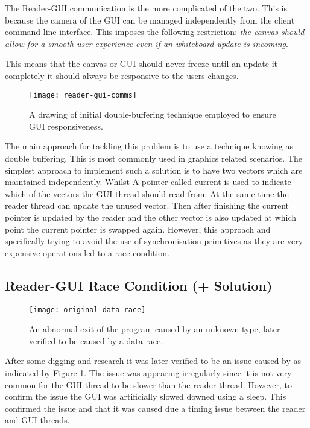 \documentclass[article]{uom-coursework}
\begin{document}
The Reader-GUI communication is the more complicated of the two.
This is because the camera of the GUI can be managed
independently from the client command line interface. This
imposes the following restriction: \emph{the canvas should allow
for a smooth user experience even if an whiteboard update is
incoming}.

This means that the canvas or GUI should never freeze until an
update it completely it should always be responsive to the users
changes.

\begin{figure}[H]
\centering
\begin{mdframed}[backgroundcolor=OffWhite]
\texttt{[image: reader-gui-comms]}
\end{mdframed}
\caption{A drawing of initial double-buffering technique
employed to ensure GUI responsiveness. }
\label{fig:readerguicomms}
\end{figure}

The main approach for tackling this problem is to use a
technique knowing as double buffering. This is most commonly
used in graphics related scenarios. The simplest approach to
implement such a solution is to have two vectors which are
maintained independently. Whilst A pointer called current is
used to indicate which of the vectors the GUI thread should read
from. At the same time the reader thread can update the unused
vector. Then after finishing the current pointer is updated by
the reader and the other vector is also updated at which point
the current pointer is swapped again. However, this approach and
specifically trying to avoid the use of synchronisation
primitives as they are very expensive operations led to a race
condition.

\subsection{Reader-GUI Race Condition (+ Solution)}

\begin{figure}[H]
\centering
\texttt{[image: original-data-race]}
\caption{An abnormal exit of the program caused by an unknown
type, later verified to be caused by a data race.}
\label{fig:originaldatarace}
\end{figure}

After some digging and research it was later verified to be an
issue caused by as indicated by Figure \ref{fig:readerguicomms}.
The issue was appearing irregularly since it is not very common
for the GUI thread to be slower than the reader thread. However,
to confirm the issue the GUI was artificially slowed downed
using a sleep. This confirmed the issue and that it was caused
due a timing issue between the reader and GUI threads.
\end{document}
